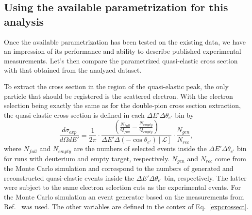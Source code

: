 \subsection*{Using the available parametrization for this analysis}

Once the available parametrization has been tested on the existing data, we have an impression of its performance and ability to describe published experimental measurements. Let's then compare the parametrized quasi-elastic cross section with that obtained from the analyzed dataset. 

To extract the cross section in the region of the quasi-elastic peak, the only particle that should be registered is the scattered electron. With the electron selection being exactly the same as for the double-pion cross section extraction, the quasi-elastic cross section is defined in each $\Delta E' \Delta \theta_{e'}$ bin by \vspace{-1.25em}
\begin{equation}
\frac{d\sigma_{exp}}{d\Omega dE'} = \frac{1}{2\pi} \cdot \frac{\left (\frac{N_{full}}{Q_{full}} - \frac{N_{empty}}{Q_{empty}} \right )}{\Delta E' \Delta(-\cos\theta_{e'}) [\mathcal{L}]} \cdot \frac{N_{gen}}{N_{rec}},\label{eq:my_xsect}
\end{equation}
where $N_{full}$ and $N_{empty}$ are the numbers of selected events inside the $\Delta E' \Delta \theta_{e'}$ bin for runs with deuterium and empty target, respectively. $N_{gen}$ and $N_{rec}$ come from the Monte Carlo simulation and correspond to the numbers of generated and reconstructed quasi-elastic events inside the $\Delta E' \Delta \theta_{e'}$ bin, respectively. The latter were subject to the same electron selection cuts as the experimental events. For the Monte Carlo simulation an event generator based on the measurements from Ref.~\cite{Osipenko:2005gt} was used. The other variables are defined in the contex of Eq.~\eqref{expcrossect}.


